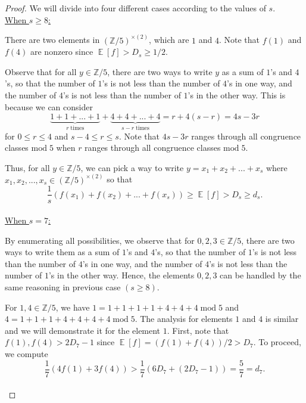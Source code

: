 \documentclass[11pt]{amsart}
\theoremstyle{plain} %
\theoremstyle{remark}
\numberwithin{equation}{section}
\newcommand{\E}{\mathop{\mathbb{E}}}
\newcommand{\Z}{\mathbb{Z}}
\begin{document}
\begin{proof}
    We will divide into four different cases according to the values of $s$.\\

    \noindent\underline{When $s\geq 8$:}

    There are two elements in $(\Z/5)^{\times(2)}$, which are $1$ and $4$. Note that $f(1)$ and $f(4)$ are nonzero since $\E[f]>D_s\geq 1/2$.

    Observe that for all $y\in \Z/5$, there are two ways to write $y$ as a sum of $1$'s and $4$'s, so that the number of $1$'s is not less than the number of $4$'s in one way, and the number of $4$'s is not less than the number of $1$'s in the other way. This is because we can consider
    \begin{equation*}
        \underbrace{1+1+...+1}_{r\;\text{times}}+\underbrace{4+4+...+4}_{s-r\;\text{times}}=r+4(s-r)=4s-3r
    \end{equation*}
    for $0\leq r\leq 4$ and $s-4\leq r\leq s$. Note that $4s-3r$ ranges through all congruence classes $\mathrm{mod}\;5$ when $r$ ranges through all congruence classes $\mathrm{mod}\;5$.

    Thus, for all $y\in \Z/5$, we can pick a way to write $y=x_1+x_2+...+x_s$ where $x_1,x_2,...,x_s\in (\Z/5)^{\times(2)}$ so that
    \begin{equation*}
        \frac{1}{s}(f(x_1)+f(x_2)+...+f(x_s))\geq \E[f]>D_s\geq d_s.
    \end{equation*}\\

    \noindent\underline{When $s=7$:}

    By enumerating all possibilities, we observe that for $0,2,3\in \Z/5$, there are two ways to write them as a sum of $1$'s and $4$'s, so that the number of $1$'s is not less than the number of $4$'s in one way, and the number of $4$'s is not less than the number of $1$'s in the other way. Hence, the elements $0,2,3$ can be handled by the same reasoning in previous case $(s\geq 8)$.

    For $1,4\in \Z/5$, we have $1=1+1+1+1+4+4+4\;\mathrm{mod}\;5$ and $4=1+1+1+4+4+4+4\;\mathrm{mod}\;5$. The analysis for elements $1$ and $4$ is similar and we will demonstrate it for the element $1$. First, note that $f(1),f(4)>2D_7-1$ since $\E[f]=(f(1)+f(4))/2>D_7$. To proceed, we compute
    \begin{equation*}
            \frac{1}{7}(4f(1)+3f(4))>\frac{1}{7}(6D_7+(2D_7-1))=\frac{5}{7}=d_7.
    \end{equation*}\\


\end{proof}
\end{document}
